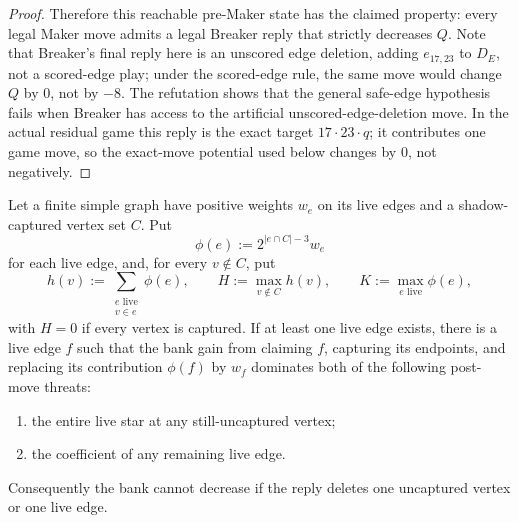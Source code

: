\begin{proof}
Therefore this reachable pre-Maker state has the claimed property: every legal
Maker move admits a legal Breaker reply that strictly decreases $Q$.
Note that Breaker's final reply here is an unscored edge deletion, adding
$e_{17,23}$ to $D_E$, not a scored-edge play; under the scored-edge rule, the
same move would change $Q$ by $0$, not by $-8$.  The refutation shows that the
general safe-edge hypothesis fails when Breaker has access to the artificial
unscored-edge-deletion move.  In the actual residual game this reply is the
exact target $17\cdot23\cdot q$; it contributes one game move, so the
exact-move potential used below changes by $0$, not negatively.
\end{proof}

\begin{proposition}
\label{prop:t2-activation-selector}
Let a finite simple graph have positive weights $w_e$ on its live edges and a
shadow-captured vertex set $C$.  Put
\[
  \phi(e):=2^{|e\cap C|-3}w_e
\]
for each live edge, and, for every $v\notin C$, put
\[
  h(v):=\sum_{\substack{e\text{ live}\\v\in e}}\phi(e),\qquad
  H:=\max_{v\notin C}h(v),
  \qquad
  K:=\max_{e\text{ live}}\phi(e),
\]
with $H=0$ if every vertex is captured.  If at least one live edge exists,
there is a live edge $f$ such that the bank gain from claiming $f$, capturing
its endpoints, and replacing its contribution $\phi(f)$ by $w_f$ dominates
both of the following post-move threats:
\begin{enumerate}
  \item the entire live star at any still-uncaptured vertex;
  \item the coefficient of any remaining live edge.
\end{enumerate}
Consequently the bank cannot decrease if the reply deletes one uncaptured
vertex or one live edge.
\end{proposition}

